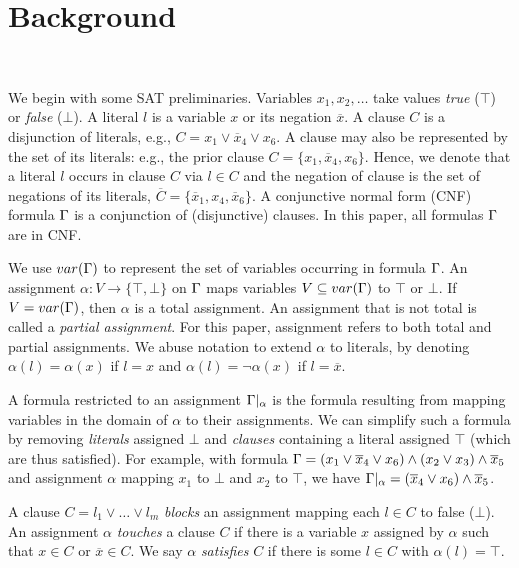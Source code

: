 \section{Background}~\label{sec:background}

We begin with some SAT preliminaries. Variables $x_1, x_2, \dots$ take values
\emph{true} ($\top$) or \emph{false} ($\bot$). A literal $l$ is a variable $x$
or its negation $\overline{x}$. A clause $C$ is a disjunction of literals, e.g.,
$C = x_1 \lor \overline{x}_4 \lor x_6$. A clause may also be represented by the
set of its literals: e.g., the prior clause $C = \{x_1, \overline{x}_4, x_6\}$.
Hence, we denote that a literal $l$ occurs in clause $C$ via $l \in C$ and the
negation of clause is the set of negations of its literals, $\overline{C} =
\{\overline{x}_1, x_4, \overline{x}_6\}$. A conjunctive normal form (CNF)
formula $\Gamma$ is a conjunction of (disjunctive) clauses. In this paper, all
formulas $\Gamma$ are in CNF.

We use $var(\Gamma)$ to represent the set of variables occurring in formula
$\Gamma$. An assignment $\alpha : V \rightarrow \{\top, \bot\}$ on
$\Gamma$ maps variables $V \subseteq var(\Gamma)$ to $\top$ or $\bot$. If $V =
var(\Gamma)$, then $\alpha$ is a total assignment. An assignment that 
is not total is called a \emph{partial assignment}. For this paper, assignment 
refers to both total and partial assignments. We abuse notation to
extend $\alpha$ to literals, by denoting $\alpha(l) = \alpha(x)$
if $l = x$ and $\alpha(l) = \neg \alpha(x)$ if $l = \overline{x}$.

A formula restricted to an assignment $\Gamma|_\alpha$ is the formula
resulting from mapping variables in the domain of $\alpha$ to their assignments.
We can simplify such a formula by removing \emph{literals} assigned $\bot$ and
\emph{clauses} containing a literal assigned $\top$ (which are thus satisfied). For
example, with formula $\Gamma = (x_1 \lor \overline{x}_4 \lor x_6) \land (x_2
\lor x_3) \land \overline{x}_5$ and assignment $\alpha$ mapping $x_1$ to $\bot$
and $x_2$ to $\top$, we have $\Gamma|_\alpha = (\overline{x}_4 \lor x_6) \land
\overline{x}_5$.

A clause $C = l_1 \lor \dots \lor l_m$ \emph{blocks} an assignment
mapping each $l \in C$ to false ($\bot$). An assignment $\alpha$ \emph{touches}
a clause $C$ if there is a variable $x$ assigned by $\alpha$ such that $x \in C$
or $\overline{x} \in C$. We say $\alpha$ \emph{satisfies} $C$ if there is some
$l \in C$ with $\alpha(l) = \top$.

